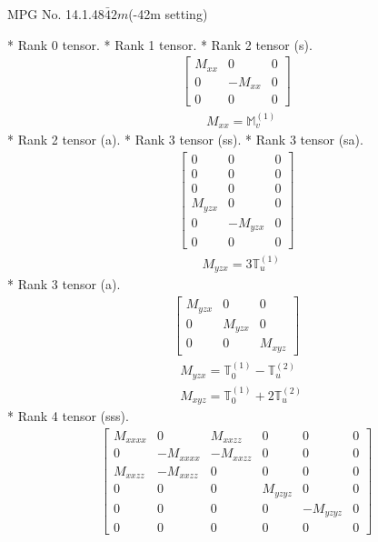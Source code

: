 \documentclass[fleqn,8pt,landscape]{jsarticle}
\begin{document}
\setcounter{MaxMatrixCols}{32}

\renewcommand{\tablename}{Table~}
\renewcommand{\figurename}{Figure~}
\begin{center}
\LARGE
MPG No. 14.1.48\quad$\bar{4}2m$\quad(-42m setting)
\end{center}
* Rank 0 tensor.
* Rank 1 tensor.
* Rank 2 tensor (s).
\begin{align*}
\begin{bmatrix} M_{xx} & 0 & 0 \\ 0 & - M_{xx} & 0 \\ 0 & 0 & 0 \end{bmatrix}
\end{align*}
\begin{align*}
& M_{xx} = \mathbb{M}_{v}^{(1)}
\end{align*}
* Rank 2 tensor (a).
* Rank 3 tensor (ss).
* Rank 3 tensor (sa).
\begin{align*}
\begin{bmatrix} 0 & 0 & 0 \\ 0 & 0 & 0 \\ 0 & 0 & 0 \\ M_{yzx} & 0 & 0 \\ 0 & - M_{yzx} & 0 \\ 0 & 0 & 0 \end{bmatrix}
\end{align*}
\begin{align*}
& M_{yzx} = 3 \mathbb{T}_{u}^{(1)}
\end{align*}
* Rank 3 tensor (a).
\begin{align*}
\begin{bmatrix} M_{yzx} & 0 & 0 \\ 0 & M_{yzx} & 0 \\ 0 & 0 & M_{xyz} \end{bmatrix}
\end{align*}
\begin{align*}
& M_{yzx} = \mathbb{T}_{0}^{(1)} - \mathbb{T}_{u}^{(2)} \\
& M_{xyz} = \mathbb{T}_{0}^{(1)} + 2 \mathbb{T}_{u}^{(2)}
\end{align*}
* Rank 4 tensor (sss).
\begin{align*}
\begin{bmatrix} M_{xxxx} & 0 & M_{xxzz} & 0 & 0 & 0 \\ 0 & - M_{xxxx} & - M_{xxzz} & 0 & 0 & 0 \\ M_{xxzz} & - M_{xxzz} & 0 & 0 & 0 & 0 \\ 0 & 0 & 0 & M_{yzyz} & 0 & 0 \\ 0 & 0 & 0 & 0 & - M_{yzyz} & 0 \\ 0 & 0 & 0 & 0 & 0 & 0 \end{bmatrix}
\end{align*}
\end{document}

